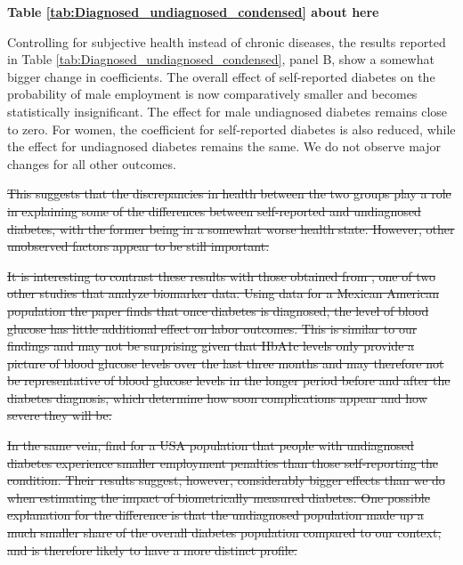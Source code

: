 \documentclass[12pt,english]{article}
\providecommand{\DIFdeltex}[1]{{\protect\color{red}\sout{#1}}}                      %
\providecommand{\DIFdelbegin}{} %
\providecommand{\DIFdel}[1]{\texorpdfstring{\DIFdeltex{#1}}{}} %
\begin{document}
\begin{center}
	\textbf{Table \ref{tab:Diagnosed_undiagnosed_condensed} about here}
\end{center}

Controlling for subjective health instead of chronic diseases, the results reported in Table \ref{tab:Diagnosed_undiagnosed_condensed}, panel B, show a somewhat bigger change in coefficients. The overall effect of self-reported diabetes on the probability of male employment is now comparatively smaller and becomes statistically insignificant. The effect for male undiagnosed diabetes remains close to zero. For women, the coefficient for self-reported diabetes is also reduced, while the effect for undiagnosed diabetes remains the same. We do not observe major changes for all other outcomes.   






\DIFdelbegin \DIFdel{This suggests that the  discrepancies in health between the two groups play a role in explaining some of the differences between self-reported and undiagnosed diabetes, with the former being in a somewhat worse health state. However, other unobserved factors appear to be still important.
}%

\DIFdel{It is interesting to contrast these results with those obtained from \textcite{BrownIII2011}, one of two other studies that analyze biomarker data. Using data for a Mexican American population the paper finds that once diabetes is diagnosed, the level of blood glucose has
little additional effect on labor outcomes. This is similar to our findings and may not be surprising given that HbA1c levels only provide a picture of blood glucose levels over the last three months and may therefore not be representative of blood glucose levels in the longer period
before and after the diabetes diagnosis, which determine how soon complications appear and how severe they will be.
}%

\DIFdel{In the same vein, \textcite{Minor2015} find for a USA population that people with undiagnosed diabetes experience smaller employment penalties than those self-reporting the condition. Their results suggest, however, considerably bigger effects than we do when estimating the impact of biometrically measured diabetes. One possible explanation for the difference is that the undiagnosed population made up a much smaller share of the overall diabetes population compared to our context, and is therefore likely to have a more distinct profile.
}%
\end{document}
